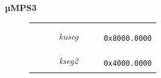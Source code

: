 \documentclass{beamer}
\begin{document}
\begin{frame}
\begin{center}
\begin{minipage}{0.45\textwidth}
\begin{block}{\textbf{µMPS3}}
\begin{figure}[h]
\begin{tabular}{rcl}
						\multicolumn{1}{r|}{}                                                               & \multicolumn{1}{c|}{\cellcolor{nord15}}                                                       &                                               \\
						\multicolumn{1}{r|}{}                                                               & \multicolumn{1}{c|}{\cellcolor{nord15}}                                                       &                                               \\
						\multicolumn{1}{r|}{}                                                               & \multicolumn{1}{c|}{\multirow{-8}{*}{{\cellcolor{nord15}\scriptsize ~~~~\textit{kuseg}~~~~}}} & \multirow{2}{*}{\texttt{{\tiny 0x8000.0000}}} \\ \hhline{--~}
						\multicolumn{1}{r|}{\multirow{6}{*}{\rotatebox{90}{{\footnotesize\!\!\!OS}}}}       & \multicolumn{1}{c|}{\cellcolor{nord9}}
						                                                                                    &                                                                                                                                               \\
						\multicolumn{1}{r|}{}                                                               & \multicolumn{1}{c|}{\cellcolor{nord9}}
						                                                                                    &                                                                                                                                               \\
						\multicolumn{1}{r|}{}                                                               & \multicolumn{1}{c|}{\cellcolor{nord9}}
						                                                                                    &                                                                                                                                               \\
						\multicolumn{1}{r|}{}                                                               & \multicolumn{1}{c|}{\multirow{-4}{*}{{\cellcolor{nord9}\scriptsize \textit{kseg2}}}}          & \multirow{2}{*}{\texttt{{\tiny 0x4000.0000}}} \\ \hhline{~-~}
						\multicolumn{1}{r|}{}                                                               & \multicolumn{1}{c|}{\cellcolor{nord9}}                                                        &                                               \\

\end{tabular}
\end{figure}
\end{block}
\end{minipage}
\end{center}
\end{frame}
\end{document}
